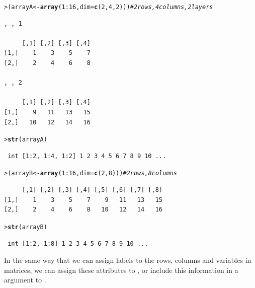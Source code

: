 \documentclass[10pt,krantz2]{krantz}\usepackage[]{graphicx}\usepackage[]{color}
\makeatletter
\newcommand{\hlnum}[1]{\textcolor[rgb]{0.686,0.059,0.569}{#1}}%
\newcommand{\hlcom}[1]{\textcolor[rgb]{0.678,0.584,0.686}{\textit{#1}}}%
\newcommand{\hlopt}[1]{\textcolor[rgb]{0,0,0}{#1}}%
\newcommand{\hlstd}[1]{\textcolor[rgb]{0.345,0.345,0.345}{#1}}%
\newcommand{\hlkwb}[1]{\textcolor[rgb]{0.69,0.353,0.396}{#1}}%
\newcommand{\hlkwc}[1]{\textcolor[rgb]{0.333,0.667,0.333}{#1}}%
\newcommand{\hlkwd}[1]{\textcolor[rgb]{0.737,0.353,0.396}{\textbf{#1}}}%
\newenvironment{kframe}{%
 \def\at@end@of@kframe{}%
 \ifinner\ifhmode%
  \def\at@end@of@kframe{\end{minipage}}%
  \begin{minipage}{\columnwidth}%
 \fi\fi%
 \def\FrameCommand##1{\hskip\@totalleftmargin \hskip-\fboxsep
 \colorbox{shadecolor}{##1}\hskip-\fboxsep
     \hskip-\linewidth \hskip-\@totalleftmargin \hskip\columnwidth}%
 \MakeFramed {\advance\hsize-\width
   \@totalleftmargin\z@ \linewidth\hsize
   \@setminipage}}%
 {\par\unskip\endMakeFramed%
 \at@end@of@kframe}
\newenvironment{knitrout}{}{} %
\renewenvironment{knitrout}{\small\renewcommand{\baselinestretch}{.85}}{} %
\makeatother
\begin{document}
\begin{knitrout}
\color{fgcolor}\begin{kframe}
\begin{alltt}
\hlstd{> }\hlstd{(arrayA} \hlkwb{<-} \hlkwd{array}\hlstd{(}\hlnum{1}\hlopt{:}\hlnum{16}\hlstd{,} \hlkwc{dim} \hlstd{=} \hlkwd{c}\hlstd{(}\hlnum{2}\hlstd{,} \hlnum{4}\hlstd{,} \hlnum{2}\hlstd{)))}     \hlcom{# 2 rows, 4 columns, 2 layers}
\end{alltt}
\begin{verbatim}
, , 1

     [,1] [,2] [,3] [,4]
[1,]    1    3    5    7
[2,]    2    4    6    8

, , 2

     [,1] [,2] [,3] [,4]
[1,]    9   11   13   15
[2,]   10   12   14   16
\end{verbatim}
\begin{alltt}
\hlstd{> }\hlkwd{str}\hlstd{(arrayA)}
\end{alltt}
\begin{verbatim}
 int [1:2, 1:4, 1:2] 1 2 3 4 5 6 7 8 9 10 ...
\end{verbatim}
\begin{alltt}
\hlstd{> }\hlstd{(arrayB} \hlkwb{<-} \hlkwd{array}\hlstd{(}\hlnum{1}\hlopt{:}\hlnum{16}\hlstd{,} \hlkwc{dim} \hlstd{=} \hlkwd{c}\hlstd{(}\hlnum{2}\hlstd{,} \hlnum{8}\hlstd{)))}        \hlcom{# 2 rows, 8 columns}
\end{alltt}
\begin{verbatim}
     [,1] [,2] [,3] [,4] [,5] [,6] [,7] [,8]
[1,]    1    3    5    7    9   11   13   15
[2,]    2    4    6    8   10   12   14   16
\end{verbatim}
\begin{alltt}
\hlstd{> }\hlkwd{str}\hlstd{(arrayB)}
\end{alltt}
\begin{verbatim}
 int [1:2, 1:8] 1 2 3 4 5 6 7 8 9 10 ...
\end{verbatim}
\end{kframe}
\end{knitrout}
In the same way that we can assign labels to the rows, columns and variables
in matrices, we can assign these attributes to , or
include this information in a  argument to .
\end{document}
